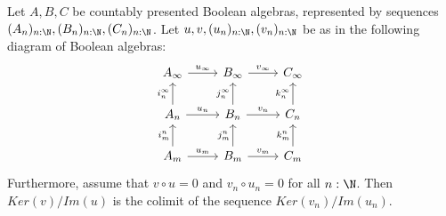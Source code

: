 \begin{lemma}
  Let $A,B,C$ be countably presented Boolean algebras, represented by sequences $(A_n)_{n:\N}, (B_n)_{n:\N},(C_n)_{n:\N}$. 
  Let $u,v,(u_n)_{n:\N},(v_n)_{n:\N}$ be as in the following diagram of Boolean algebras:
  \begin{equation}
    \begin{tikzcd}
      A_\infty \arrow[r,"u_\infty"] & B_\infty  \arrow[r,"v_\infty"] & C_\infty
      \\
      A_n \arrow[u,"i_n^\infty"] \arrow[r,"u_n"] & B_n \arrow[u,"j_n^\infty"] \arrow[r,"v_n"] & C_n \arrow[u,"k^\infty_n"]
      \\
      A_m \arrow[u,"i_m^n"] \arrow[r,"u_m"] & B_m \arrow[u,"j_m^n"] \arrow[r,"v_m"] & C_m \arrow[u,"k_m^n"]
    \end{tikzcd} 
  \end{equation} 
  Furthermore, assume that $v\circ u = 0$ and $v_n \circ u_n = 0$ for all $n:\N$.
  Then $Ker(v)/Im(u)$ is the colimit of the sequence $Ker(v_n)/Im(u_n)$. 
\end{lemma}
